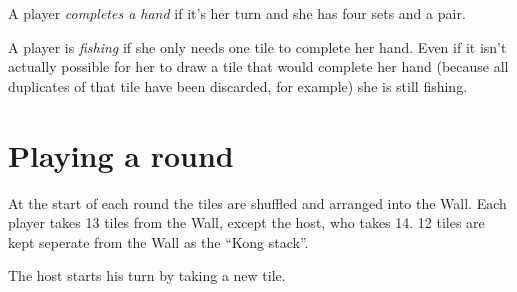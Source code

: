 \documentclass{article}
\begin{document}
A player \emph{completes a hand} if it's her turn and she has four sets and a pair.

A player is \emph{fishing} if she only needs one tile to complete her hand. Even if it isn't actually possible for her to draw a tile that would complete her hand (because all duplicates of that tile have been discarded, for example) she is still fishing.

\section{Playing a round}
At the start of each round the tiles are shuffled and arranged into the Wall. Each player takes 13 tiles from the Wall, except the host, who takes 14. 12 tiles are kept seperate from the Wall as the ``Kong stack''.

The host starts his turn by taking a new tile.
\end{document}
